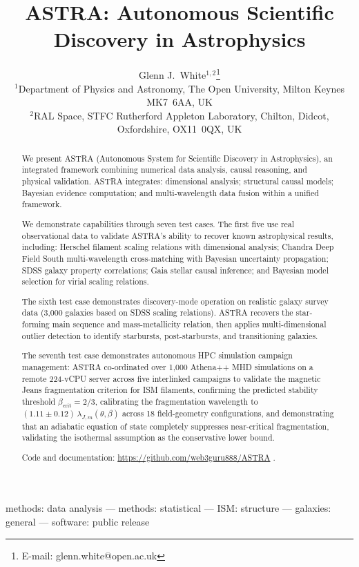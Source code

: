\documentclass[usenatbib]{rasti}
\title[ASTRA: Autonomous Astrophysical Discovery]{ASTRA: Autonomous Scientific Discovery in Astrophysics}
\author[White]{
Glenn J.~White$^{1,2}$\thanks{E-mail: glenn.white@open.ac.uk}\\
$^{1}$Department of Physics and Astronomy, The Open University, Milton Keynes MK7~6AA, UK\\
$^{2}$RAL Space, STFC Rutherford Appleton Laboratory, Chilton, Didcot, Oxfordshire, OX11~0QX, UK
}
\begin{document}

\maketitle

\label{firstpage}

\begin{keywords}
methods: data analysis --- methods: statistical --- ISM: structure --- galaxies: general --- software: public release
\end{keywords}

\begin{abstract}
We present ASTRA (Autonomous System for Scientific Discovery in Astrophysics), an integrated framework combining numerical data analysis, causal reasoning, and physical validation. ASTRA integrates: dimensional analysis; structural causal models; Bayesian evidence computation; and multi-wavelength data fusion within a unified framework.

We demonstrate capabilities through seven test cases. The first five use real observational data to validate ASTRA's ability to recover known astrophysical results, including: Herschel filament scaling relations with dimensional analysis; Chandra Deep Field South multi-wavelength cross-matching with Bayesian uncertainty propagation; SDSS galaxy property correlations; Gaia stellar causal inference; and Bayesian model selection for virial scaling relations.

The sixth test case demonstrates discovery-mode operation on realistic galaxy survey data (3,000 galaxies based on SDSS scaling relations). ASTRA recovers the star-forming main sequence and mass-metallicity relation, then applies multi-dimensional outlier detection to identify starbursts, post-starbursts, and transitioning galaxies.

The seventh test case demonstrates autonomous HPC simulation campaign management: ASTRA co-ordinated over 1,000 Athena++ MHD simulations on a remote 224-vCPU server across five interlinked campaigns to validate the magnetic Jeans fragmentation criterion for ISM filaments, confirming the predicted stability threshold $\beta_\mathrm{crit} = 2/3$, calibrating the fragmentation wavelength to $(1.11 \pm 0.12)\,\lambda_{J,m}(\theta,\beta)$ across 18 field-geometry configurations, and demonstrating that an adiabatic equation of state completely suppresses near-critical fragmentation, validating the isothermal assumption as the conservative lower bound.

Code and documentation: \url{https://github.com/web3guru888/ASTRA} \citep{astra_github}.
\end{abstract}
\end{document}
